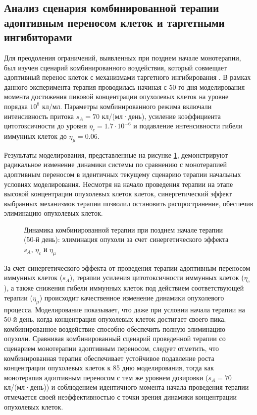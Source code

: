 \subsection{Анализ сценария комбинированной терапии адоптивным переносом клеток
и таргетными ингибиторами}

Для преодоления ограничений, выявленных при позднем начале монотерапии, был
изучен сценарий комбинированного воздействия, который совмещает адоптивный
перенос клеток с механизмами таргетного ингибирования \cite{target_therapy}. В
рамках данного эксперимента терапия проводилась начиная с 50-го дня моделирования
-- момента достижения пиковой концентрации опухолевых клеток на уровне порядка
$10^8$ кл/мл. Параметры комбинированного режима включали интенсивность притока
$s_A = 70$ кл/(мл·день), усиление коэффициента цитотоксичности до уровня
$\eta_c = 1.7 \cdot 10^{-6}$ и подавление интенсивности гибели иммунных клеток до
$\eta_{\mu} = 0.06$.

Результаты моделирования, представленные на рисунке \ref{fig:combined_50_day},
демонстрируют радикальное изменение динамики системы по сравнению с
монотерапией адоптивным переносом в идентичных текущему сценарию терапии
начальных условиях моделирования. Несмотря на начало проведения терапии
на этапе высокой концентрации опухолевых клеток клеток, синергетический
эффект выбранных механизмов терапии позволил остановить распространение,
обеспечив элиминацию опухолевых клеток.

\begin{figure}[ht!]
  \centering
  
  \caption{Динамика комбинированной терапии при позднем начале терапии (50-й день):
  элиминация опухоли за счет синергетического эффекта $s_A$, $\eta_c$ и $\eta_{\mu}$}
  \label{fig:combined_50_day}
\end{figure}

За счет синергетического эффекта от проведения терапии адоптивным переносом иммунных
клеток ($s_A$), терапии усиления цитотоксичности иммунных клеток ($\eta_c$), а также
снижения гибели иммунных клеток под действием соответствующей терапии ($\eta_{\mu}$)
происходит качественное изменение динамики опухолевого процесса. Моделирование
показывает, что даже при условии начала терапии на 50-й день, когда
концентрация опухолевых клеток достигает своего пика, комбинированное
воздействие способно обеспечить полную элиминацию опухоли. Сравнивая
комбинированный сценарий проведенной терапии со сценарием монотерапии
адоптивным переносом, следует отметить, что комбинированная терапия
обеспечивает устойчивое подавление роста концентрации опухолевых клеток к 85
дню моделирования, тогда как монотерапия адоптивным переносом с тем же уровнем
дозировки ($s_A = 70$ кл/(мл·день)) и соблюдением идентичного момента начала
проведения терапии отмечается своей неэффективностью с точки зрения динамики
концентрации опухолевых клеток.


